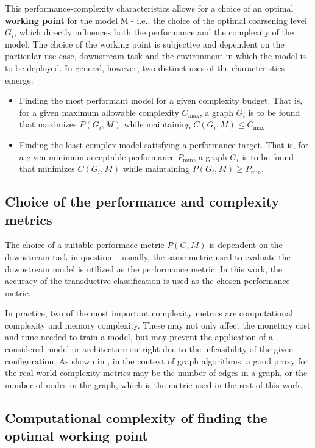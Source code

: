 This performance-complexity characteristics allows for a choice of an optimal \textbf{working point} for the model M - i.e., the choice of the optimal coarsening level \( G_i \), which directly influences both the performance and the complexity of the model. The choice of the working point is subjective and dependent on the particular use-case, downstream task and the environment in which the model is to be deployed. In general, however, two distinct uses of the characteristics emerge:
\begin{itemize}
  \item Finding the most performant model for a given complexity budget. That is, for a given maximum allowable complexity \( C_\mathrm{max} \), a graph \( G_i \) is to be found that maximizes \( P \left( G_i, M \right) \) while maintaining \( C \left( G_i, M \right) \leq C_\mathrm{max} \).
  \item Finding the least complex model satisfying a performance target. That is, for a given minimum acceptable performance \( P_\mathrm{min} \), a graph \( G_i \) is to be found that minimizes \( C \left( G_i, M \right) \) while maintaining \( P \left( G_i, M \right) \geq P_\mathrm{min} \).
\end{itemize}

\subsection{Choice of the performance and complexity metrics}

The choice of a suitable performace metric \( P \left( G, M \right) \) is dependent on the downstream task in question -- usually, the same metric used to evaluate the downstream model is utilized as the performance metric. In this work, the accuracy of the transductive classification is used as the chosen performance metric.

In practice, two of the most important complexity metrics are computational complexity and memory complexity. These may not only affect the monetary cost and time needed to train a model, but may prevent the application of a considered model or architecture outright due to the infeasibility of the given configuration. As shown in \cite{chiang_cluster-gcn_2019}, in the context of graph algorithms, a good proxy for the real-world complexity metrics may be the number of edges in a graph, or the number of nodes in the graph, which is the metric used in the rest of this work.

\subsection{Computational complexity of finding the optimal working point}

